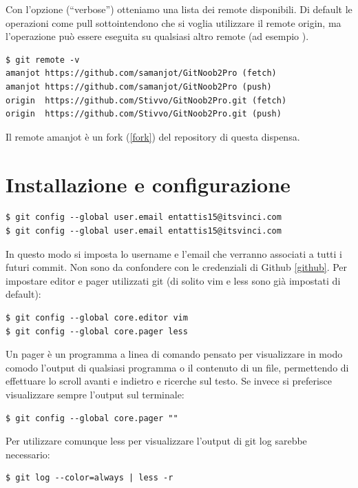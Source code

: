 \documentclass{article} \usepackage[textwidth=19cm,textheight=24cm]{geometry}
\begin{document}
Con l'opzione  (``verbose'') otteniamo una lista dei remote disponibili.
Di default le operazioni come pull sottointendono che si voglia utilizzare il 
remote origin, ma l'operazione può essere eseguita su qualsiasi altro remote
(ad esempio ).

\begin{verbatim}
$ git remote -v
amanjot	https://github.com/samanjot/GitNoob2Pro (fetch)
amanjot	https://github.com/samanjot/GitNoob2Pro (push)
origin	https://github.com/Stivvo/GitNoob2Pro.git (fetch)
origin	https://github.com/Stivvo/GitNoob2Pro.git (push)
\end{verbatim}

Il remote amanjot è un fork (\ref{fork}) del repository di questa dispensa.

\section{Installazione e configurazione\label{configurazione}}

\begin{verbatim}
$ git config --global user.email entattis15@itsvinci.com
$ git config --global user.email entattis15@itsvinci.com
\end{verbatim}

In questo modo si imposta lo username e l'email che verranno associati a tutti i
futuri commit. Non sono da confondere con le credenziali di Github \ref{github}.
Per impostare editor e pager utilizzati git (di solito vim e less sono già 
impostati di default):

\begin{verbatim}
$ git config --global core.editor vim
$ git config --global core.pager less
\end{verbatim}

Un pager è un programma a linea di comando pensato per visualizzare in modo comodo
l'output di qualsiasi programma o il contenuto di un file, permettendo di
effettuare lo scroll avanti e indietro e ricerche sul testo.
Se invece si preferisce visualizzare sempre l'output sul terminale:

\begin{verbatim}
$ git config --global core.pager ""
\end{verbatim}

Per utilizzare comunque less per visualizzare l'output di git log sarebbe
necessario:

\begin{verbatim}
$ git log --color=always | less -r 
\end{verbatim}
\end{document}
